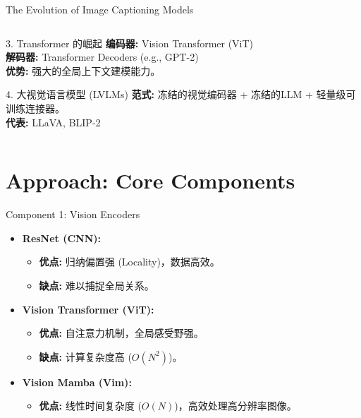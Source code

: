 \documentclass{beamer}
\begin{document}
\begin{CJK}{UTF8}{gbsn}
\begin{frame}{The Evolution of Image Captioning Models}
\begin{columns}[T]
        \begin{column}{0.5\textwidth}
            \begin{block}{3. Transformer 的崛起}
                \textbf{编码器:} Vision Transformer (ViT) \\
                \textbf{解码器:} Transformer Decoders (e.g., GPT-2) \\
                \textbf{优势:} 强大的全局上下文建模能力。
            \end{block}
            
            \begin{block}{4. 大视觉语言模型 (LVLMs)}
                 \textbf{范式:} 冻结的视觉编码器 + 冻结的LLM + 轻量级可训练连接器。\\
                 \textbf{代表:} LLaVA, BLIP-2
            \end{block}
        \end{column}
    \end{columns}
\end{frame}

\section{Approach: Core Components}

\begin{frame}{Component 1: Vision Encoders}
    \begin{itemize}
        \item \textbf{ResNet (CNN):}
        \begin{itemize}
            \item \textbf{优点:} 归纳偏置强 (Locality)，数据高效。
            \item \textbf{缺点:} 难以捕捉全局关系。
        \end{itemize}
        \medskip
        
        \item \textbf{Vision Transformer (ViT):}
        \begin{itemize}
            \item \textbf{优点:} 自注意力机制，全局感受野强。
            \item \textbf{缺点:} 计算复杂度高 ($O(N^2)$)。
        \end{itemize}
        \medskip

        \item \textbf{Vision Mamba (Vim):}
        \begin{itemize}
            \item \textbf{优点:} 线性时间复杂度 ($O(N)$)，高效处理高分辨率图像。
        \end{itemize}
        \medskip
        

\end{itemize}
\end{frame}
\end{CJK}
\end{document}
